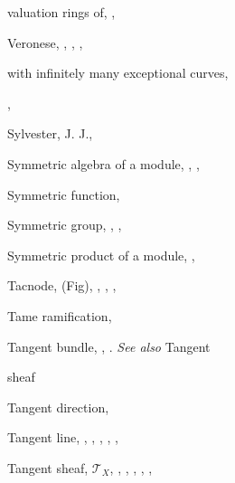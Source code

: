 {{\noindent\hspace*{7.5bp}valuation rings of, , \par
\noindent\hspace*{7.5bp}Veronese, , , , \par
\noindent\hspace*{7.5bp}with infinitely many exceptional curves,\par
\noindent\hspace*{15.0bp}, \par
\noindent\hspace*{0.0bp}Sylvester, J. J., \par
\noindent\hspace*{0.0bp}Symmetric algebra of a module, , , \par
\noindent\hspace*{0.0bp}Symmetric function, \par
\noindent\hspace*{0.0bp}Symmetric group, , , \par
\noindent\hspace*{0.0bp}Symmetric product of a module, , \par
\vspace{8.55bp}
\noindent\hspace*{0.0bp}Tacnode,  (Fig), , , , \par
\noindent\hspace*{0.0bp}Tame ramification, \par
\noindent\hspace*{0.0bp}Tangent bundle, , . \emph{See also} Tangent\par
\noindent\hspace*{15.0bp}sheaf\par
\noindent\hspace*{0.0bp}Tangent direction, \par
\noindent\hspace*{0.0bp}Tangent line, , , , , , \par
\noindent\hspace*{0.0bp}Tangent sheaf, $\mathcal T_X$, , , , , ,\par
}}
